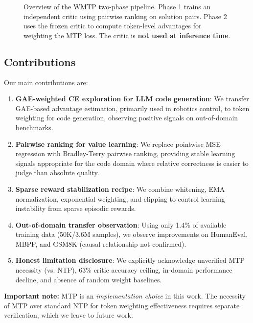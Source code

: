 \begin{figure}[t]
    \centering
    \caption{Overview of the WMTP two-phase pipeline. Phase 1 trains an independent critic using pairwise ranking on solution pairs. Phase 2 uses the frozen critic to compute token-level advantages for weighting the MTP loss. The critic is \textbf{not used at inference time}.}
    \label{fig:pipeline}
\end{figure}

\subsection{Contributions}

Our main contributions are:

\begin{enumerate}[nosep]
    \item \textbf{GAE-weighted CE exploration for LLM code generation}: We transfer GAE-based advantage estimation, primarily used in robotics control, to token weighting for code generation, observing positive signals on out-of-domain benchmarks.

    \item \textbf{Pairwise ranking for value learning}: We replace pointwise MSE regression with Bradley-Terry pairwise ranking, providing stable learning signals appropriate for the code domain where relative correctness is easier to judge than absolute quality.

    \item \textbf{Sparse reward stabilization recipe}: We combine whitening, EMA normalization, exponential weighting, and clipping to control learning instability from sparse episodic rewards.

    \item \textbf{Out-of-domain transfer observation}: Using only 1.4\% of available training data (50K/3.6M samples), we observe improvements on HumanEval, MBPP, and GSM8K (causal relationship not confirmed).

    \item \textbf{Honest limitation disclosure}: We explicitly acknowledge unverified MTP necessity (vs. NTP), 63\% critic accuracy ceiling, in-domain performance decline, and absence of random weight baselines.
\end{enumerate}

\textbf{Important note:} MTP is an \textit{implementation choice} in this work. The necessity of MTP over standard NTP for token weighting effectiveness requires separate verification, which we leave to future work.
